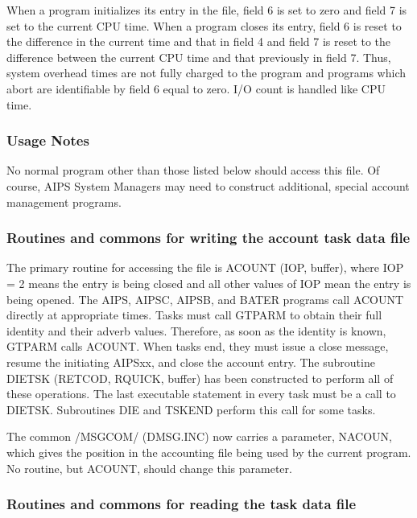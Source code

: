 When a program initializes its entry in the file, field 6 is set to
zero and field 7 is set to the current CPU time.  When a program closes
its entry, field 6 is reset to the difference in the current time and
that in field 4 and field 7 is reset to the difference between the
current CPU time and that previously in field 7.  Thus, system
overhead times are not fully charged to the program and programs
which abort are identifiable by field 6 equal to zero.  I/O count is
handled like CPU time.


\subsubsection{Usage Notes}


     No normal program other than those listed below should access
this file.  Of course, AIPS System Managers may need to construct
additional, special account management programs.


\subsubsection{Routines and commons for writing the account task data file}

      The primary routine for accessing the file is ACOUNT (IOP,
buffer), where IOP = 2 means the entry is being closed and all other
values of IOP mean the entry is being opened.  The AIPS, AIPSC, AIPSB,
and BATER programs call ACOUNT directly at appropriate times.  Tasks
must call GTPARM to obtain their full identity and their adverb values.
Therefore, as soon as the identity is known, GTPARM calls ACOUNT.
When tasks end, they must issue a close message, resume the initiating
AIPSxx, and close the account entry.  The subroutine DIETSK (RETCOD,
RQUICK, buffer) has been constructed to perform all of these
operations.  The last executable statement in every task must be a call
to DIETSK.  Subroutines DIE and TSKEND perform this call for some
tasks.

     The common /MSGCOM/ (DMSG.INC) now carries a parameter, NACOUN,
which gives the position in the accounting file being used by the
current program.  No routine, but ACOUNT, should change this
parameter.


\subsubsection{Routines and commons for reading the task data file}

